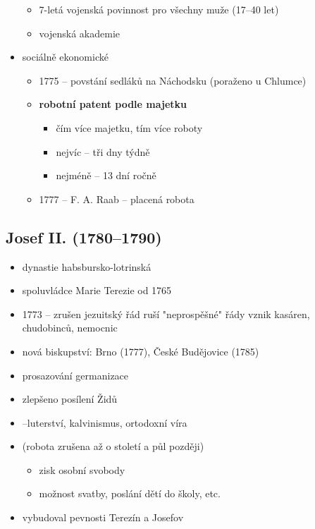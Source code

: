 \begin{itemize}
\begin{itemize}
	\item 7-letá vojenská povinnost pro všechny muže (17--40 let)
	\item vojenská akademie
	\end{itemize}
\item sociálně ekonomické
	\begin{itemize}
	\item 1775 -- povstání sedláků na Náchodsku (poraženo u Chlumce)
	\item[\ra] \textbf{robotní patent podle majetku}
		\begin{itemize}
		\item čím více majetku, tím více roboty
		\item nejvíc -- tři dny týdně
		\item nejméně -- 13 dní ročně
		\end{itemize}
	\item 1777 -- F. A. Raab -- placená robota
	\end{itemize}
\end{itemize}

\subsection{Josef II. (1780--1790)}
\begin{itemize}
\item dynastie habsbursko-lotrinská
\item spoluvládce Marie Terezie od 1765
\item 1773 -- zrušen jezuitský řád \ra ruší "neprospěšné" řády \ra vznik kasáren, chudobinců, nemocnic
\item nová biskupství: Brno (1777), České Budějovice (1785)
\item prosazování germanizace
\item zlepšeno posílení Židů
\item {} --luterství, kalvinismus, ortodoxní víra
\item {} (robota zrušena až o století a půl později)
	\begin{itemize}
	\item zisk osobní svobody
	\item možnost svatby, poslání dětí do školy, etc.
	\end{itemize}
\item vybudoval pevnosti Terezín a Josefov
\end{itemize}


